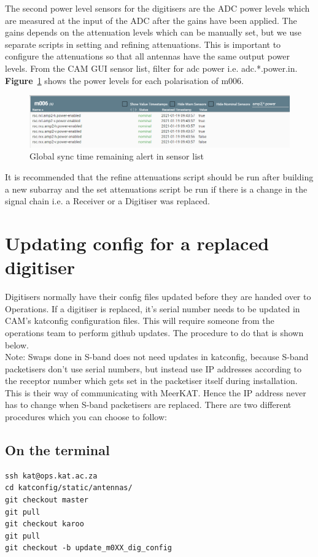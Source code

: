 The second power level sensors for the digitisers are the ADC power levels which are
measured at the input of the ADC after the gains have been applied. The gains depends on
the attenuation levels which can be manually set, but we use separate scripts in setting and
refining attenuations. This is important to configure the attenuations so that all antennas
have the same output power levels. From the CAM GUI sensor list, filter for adc power i.e.
adc.*.power.in. \textbf{Figure}~\ref{fig:image51} shows the power levels for each polarisation of m006.
\begin{figure}[H]
	\centering
	\includegraphics[scale=0.4]{Chapters/images/image51.png}
	
	\caption{Global sync time remaining alert in sensor list}
	\label{fig:image51}
\end{figure}
It is recommended that the refine attenuations script should be run after building a new
subarray and the set attenuations script be run if there is a change in the signal chain i.e. a
Receiver or a Digitiser was replaced.
\section{ Updating config for a replaced digitiser}
Digitisers normally have their config files updated before they are handed over to
Operations. If a digitiser is replaced, it's serial number needs to be updated in CAM's
katconfig configuration files. This will require someone from the operations team to perform
github updates. The procedure to do that is shown below.\\

Note: Swaps done in S-band does not need updates in katconfig, because S-band
packetisers don’t use serial numbers, but instead use IP addresses according to the receptor number which gets set in the packetiser itself during installation.  This is their way
of communicating with MeerKAT. Hence the IP address never has to change when S-band
packetisers are replaced.
There are two different procedures which you can choose to follow:
\subsection{ On the terminal}
\begin{lstlisting}[style=DOS]
ssh kat@ops.kat.ac.za
cd katconfig/static/antennas/
git checkout master
git pull
git checkout karoo
git pull
git checkout -b update_m0XX_dig_config
\end{lstlisting}

